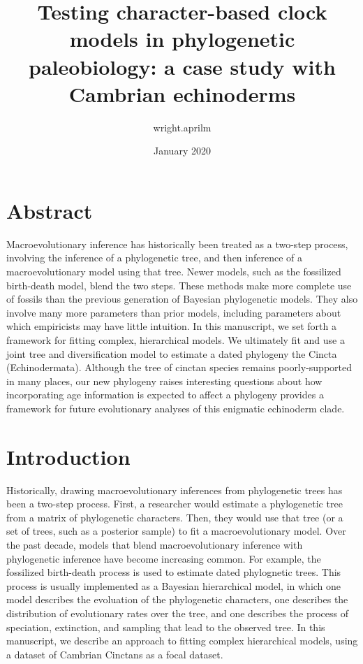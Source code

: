 \documentclass{article}
\title{Testing character-based clock models in phylogenetic paleobiology: a case study with Cambrian echinoderms}
\author{wright.aprilm }
\date{January 2020}
\begin{document}
\maketitle

\section{Abstract}

Macroevolutionary inference has historically been treated as a two-step process, involving the inference of a phylogenetic tree, and then inference of a macroevolutionary model using that tree.
Newer models, such as the fossilized birth-death model, blend the two steps.
These methods make more complete use of fossils than the previous generation of Bayesian phylogenetic models.
They also involve many more parameters than prior models, including parameters about which empiricists may have little intuition.
In this manuscript, we set forth a framework for fitting complex, hierarchical models.
We ultimately fit and use a joint tree and diversification model to estimate a dated phylogeny the Cincta (Echinodermata).
Although the tree of cinctan species remains poorly-supported in many places, our new phylogeny raises interesting questions about how incorporating age information is expected to affect a phylogeny provides a framework for future evolutionary analyses of this enigmatic echinoderm clade.

\section{Introduction}

Historically, drawing macroevolutionary inferences from phylogenetic trees has been a two-step process.
First, a researcher would estimate a phylogenetic tree from a matrix of phylogenetic characters.
Then, they would use that tree (or a set of trees, such as a posterior sample) to fit a macroevolutionary model.
Over the past decade, models that blend macroevolutionary inference with phylogenetic inference have become increasing common.
For example, the fossilized birth-death process is used to estimate dated phylognetic trees.
This process is usually implemented as a Bayesian hierarchical model, in which one model describes the evoluation of the phylogenetic characters, one describes the distribution of evolutionary rates over the tree, and one describes the process of speciation, extinction, and sampling that lead to the observed tree.
In this manuscript, we describe an approach to fitting complex hierarchical models, using a dataset of Cambrian Cinctans as a focal dataset.
\end{document}
